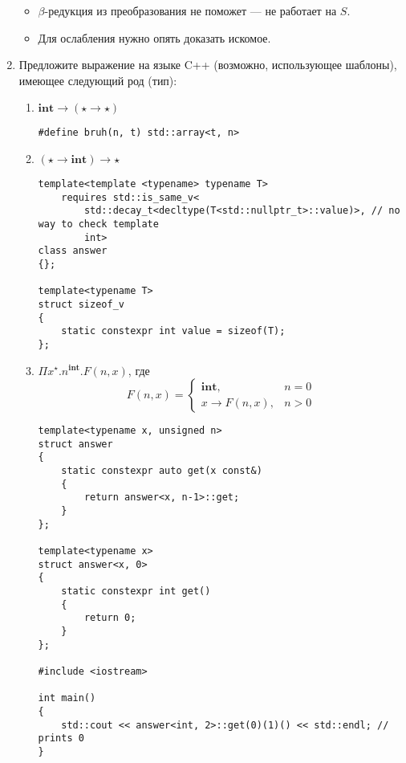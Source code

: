 \begin{enumerate}
\begin{solution}
\begin{itemize}
                  \item \(\beta\)-редукция из преобразования не поможет --- не работает на \(S\).
                  \item Для ослабления нужно опять доказать искомое.
              \end{itemize}
          \end{solution}

    \item Предложите выражение на языке C++ (возможно, использующее шаблоны), имеющее следующий род (тип):
          \begin{enumerate}
              \item $\textbf{int}\rightarrow(\star\rightarrow\star)$
                    \begin{verbatim}
#define bruh(n, t) std::array<t, n>
                \end{verbatim}
              \item $(\star\rightarrow\textbf{int})\rightarrow\star$
                    \begin{verbatim}
template<template <typename> typename T>
    requires std::is_same_v<
        std::decay_t<decltype(T<std::nullptr_t>::value)>, // no way to check template
        int>
class answer
{};

template<typename T>
struct sizeof_v
{
    static constexpr int value = sizeof(T);
};
              \end{verbatim}
              \item $\Pi x^\star.n^\textbf{int}.F(n,x)$, где $$F(n,x) = \left\{\begin{array}{ll}\textbf{int},    & n = 0 \\
             x\rightarrow F(n,x), & n > 0\end{array}\right.$$
                    \begin{solution}\itemfix
                        \begin{verbatim}
template<typename x, unsigned n>
struct answer
{
    static constexpr auto get(x const&)
    {
        return answer<x, n-1>::get;
    }
};

template<typename x>
struct answer<x, 0>
{
    static constexpr int get()
    {
        return 0;
    }
};

#include <iostream>

int main()
{
    std::cout << answer<int, 2>::get(0)(1)() << std::endl; // prints 0
}
                 \end{verbatim}
                    \end{solution}
          \end{enumerate}


\end{enumerate}
